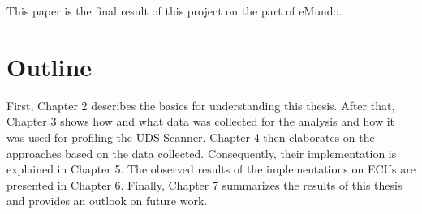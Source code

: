 This paper is the final result of this project on the part of eMundo.

\section{Outline}

First, Chapter 2 describes the basics for understanding this thesis. After that, Chapter 3 shows how and what data was collected for the analysis and how it was used for profiling the UDS Scanner. Chapter 4 then elaborates on the approaches based on the data collected.
Consequently, their implementation is explained in Chapter 5. The observed results of the implementations on ECUs are presented in Chapter 6. Finally, Chapter 7 summarizes the results of this thesis and provides an outlook on future work.
